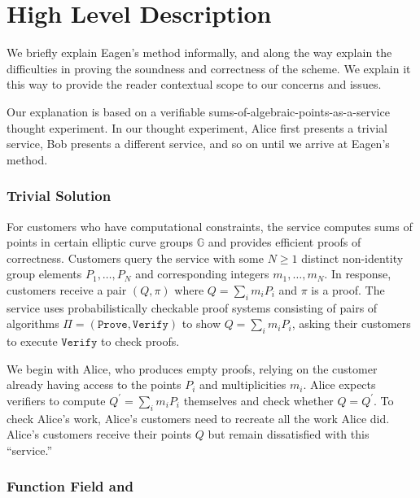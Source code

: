 \documentclass{article}
\theoremstyle{definition}
\newcommand{\6}{\mathbf}
\newcommand{\7}{\mathcal}
\begin{document}
\section{High Level Description}\label{sec:high_level}

We briefly explain Eagen's method informally, and along the way explain the difficulties in proving the soundness and correctness of the scheme. We explain it this way to provide the reader contextual scope to our concerns and issues. 

Our explanation is based on a verifiable sums-of-algebraic-points-as-a-service thought experiment. In our thought experiment, Alice first presents a trivial service, Bob presents a different service, and so on until we arrive at Eagen's method. %

\subsubsection{Trivial Solution}

For customers who have computational constraints, the service computes sums of points in certain elliptic curve groups $\mathbb{G}$ and provides efficient proofs of correctness.
Customers query the service with some $N \geq 1$ distinct non-identity group elements $P_1, \ldots, P_N$ and corresponding integers $m_1, \ldots, m_N$. In response, customers receive a pair $(Q, \pi)$ where $Q = \sum_i m_i P_i$ and $\pi$ is a proof.
The service uses probabilistically checkable proof systems consisting of pairs of algorithms $\Pi = (\texttt{Prove}, \texttt{Verify})$ to show $Q = \sum_i m_i P_i$, asking their customers to execute $\texttt{Verify}$ to check proofs. 

We begin with Alice, who produces empty proofs, relying on the customer already having access to the points $P_i$ and multiplicities $m_i$. Alice expects verifiers to compute $Q^\prime = \sum_i m_i P_i$ themselves and check whether $Q = Q^\prime$. To check Alice's work, Alice's customers need to recreate all the work Alice did. Alice's customers receive their points $Q$ but remain dissatisfied with this ``service.''

\subsubsection{Function Field  and }
\end{document}
